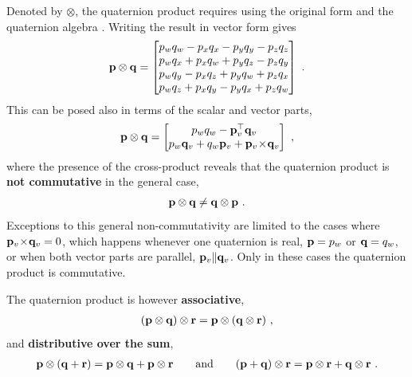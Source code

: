Denoted by $\otimes$, the quaternion product requires using the original form  and the quaternion algebra . 
Writing the result in vector form gives
%
\begin{align}
{\bf p}\otimes{\bf q} = \begin{bmatrix}
p_wq_w - p_{x}q_{x} - p_{y}q_{y} - p_{z}q_{z} \\
p_wq_{x} + p_{x}q_w + p_{y}q_{z} - p_{z}q_{y} \\
p_wq_{y} - p_{x}q_{z} + p_{y}q_w + p_{z}q_{x} \\
p_wq_{z} + p_{x}q_{y} - p_{y}q_{x} + p_{z}q_w  
\end{bmatrix}~. \label{equ:quatProd}
\end{align}
%
This can be posed also in terms of the scalar and vector parts,
%
\begin{align}
{\bf p}\otimes{\bf q} = \begin{bmatrix}
p_wq_w - {\bf p}_v^{\top}{\bf q}_v \\
p_w{\bf q}_v+q_w{\bf p}_v+{\bf p}_v\!\times\!{\bf q}_v
\end{bmatrix}~, \label{equ:quatProdVec}
\end{align}
%
where 
the presence of the cross-product
reveals that the quaternion product is \textbf{not commutative} in the general case,
%
\begin{align}
{\bf p}\otimes{\bf q}\neq{\bf q}\otimes{\bf p}~.
\end{align}
%
Exceptions to this general non-commutativity are limited to the cases where ${\bf p}_v\!\times\!{\bf q}_v=0$, which happens whenever one quaternion is real, ${\bf p}=p_w$ or ${\bf q}=q_w$, or when both vector parts are parallel, ${\bf p}_v \| {\bf q}_v$. Only in these cases the quaternion product is commutative.

The quaternion product is however \textbf{associative},
%
\begin{align}
({\bf p}\otimes{\bf q})\otimes{\bf r} = {\bf p}\otimes({\bf q}\otimes{\bf r})~,
\end{align}
%
and \textbf{distributive over the sum},
%
\begin{align}
{\bf p}\otimes({\bf q}+{\bf r}) = {\bf p}\otimes{\bf q} + {\bf p}\otimes{\bf r}
\qquad \textrm{and} \qquad
({\bf p}+{\bf q})\otimes{\bf r} = {\bf p}\otimes{\bf r} + {\bf q}\otimes{\bf r}~.
\end{align}
%



